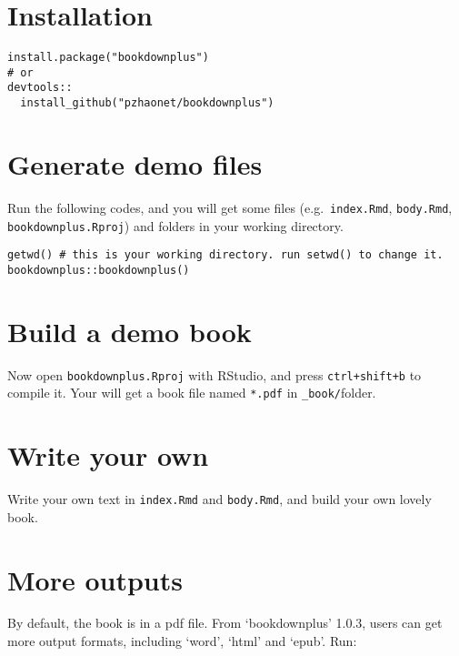 \documentclass[11pt,a4paper,twoside,openright]{report}
\theoremstyle{definition}
\numberwithin{equation}{subsection}
\begin{document}
\hypertarget{installation}{%
\section{Installation}\label{installation}}

\begin{verbatim}
install.package("bookdownplus")
# or
devtools::
  install_github("pzhaonet/bookdownplus")
\end{verbatim}

\hypertarget{generate-demo-files}{%
\section{Generate demo files}\label{generate-demo-files}}

Run the following codes, and you will get some files (e.g.~\texttt{index.Rmd},
\texttt{body.Rmd}, \texttt{bookdownplus.Rproj}) and folders in your working directory.

\begin{verbatim}
getwd() # this is your working directory. run setwd() to change it.
bookdownplus::bookdownplus()
\end{verbatim}

\hypertarget{build-a-demo-book}{%
\section{Build a demo book}\label{build-a-demo-book}}

Now open \texttt{bookdownplus.Rproj} with RStudio, and press \texttt{ctrl+shift+b} to compile
it. Your will get a book file named \texttt{*.pdf} in \texttt{\_book/}folder.

\hypertarget{write-your-own}{%
\section{Write your own}\label{write-your-own}}

Write your own text in \texttt{index.Rmd} and \texttt{body.Rmd}, and build your own lovely
book.

\hypertarget{more-outputs}{%
\section{More outputs}\label{more-outputs}}

By default, the book is in a pdf file. From `bookdownplus' 1.0.3, users can get
more output formats, including `word', `html' and `epub'. Run:
\end{document}
